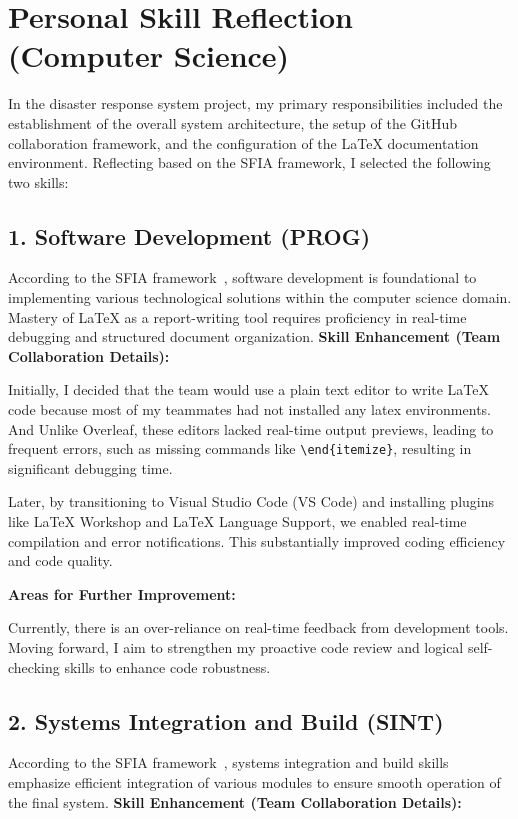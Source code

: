 \documentclass[a4paper, 11pt]{report}
\begin{document}
\section*{Personal Skill Reflection (Computer Science)}

In the disaster response system project, my primary responsibilities included the establishment of the overall system architecture, the setup of the GitHub collaboration framework, and the configuration of the LaTeX documentation environment. Reflecting based on the SFIA framework, I selected the following two skills:

\subsection*{1. Software Development (PROG)}

According to the SFIA framework~\cite{sfia}, software development is foundational to implementing various technological solutions within the computer science domain. Mastery of LaTeX as a report-writing tool requires proficiency in real-time debugging and structured document organization.
\textbf{Skill Enhancement (Team Collaboration Details):}

Initially, I decided that the team would use a plain text editor to write LaTeX code because most of my teammates had not installed any latex environments. And Unlike Overleaf, these editors lacked real-time output previews, leading to frequent errors, such as missing commands like \texttt{\textbackslash end\{itemize\}}, resulting in significant debugging time.

Later, by transitioning to Visual Studio Code (VS Code) and installing plugins like LaTeX Workshop and LaTeX Language Support, we enabled real-time compilation and error notifications. This substantially improved coding efficiency and code quality.

\textbf{Areas for Further Improvement:}

Currently, there is an over-reliance on real-time feedback from development tools. Moving forward, I aim to strengthen my proactive code review and logical self-checking skills to enhance code robustness.

\subsection*{2. Systems Integration and Build (SINT)}

According to the SFIA framework~\cite{sfia}, systems integration and build skills emphasize efficient integration of various modules to ensure smooth operation of the final system.
\textbf{Skill Enhancement (Team Collaboration Details):}
\end{document}
